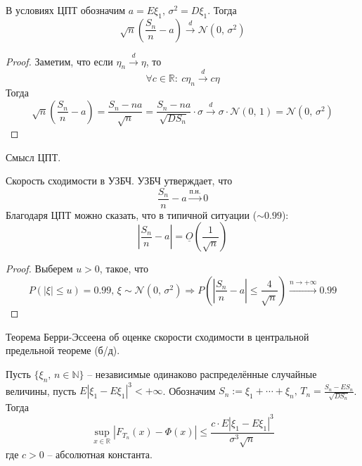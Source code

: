 \begin{corollary}
  В условиях ЦПТ обозначим $a = E\xi_1,\, \sigma^2 = D\xi_1$. Тогда
  \[\sqrt{n}\left(\frac{S_n}{n} - a\right) \stackrel{d}{\to} \mathcal{N}(0,\, \sigma^2)\]
\end{corollary}

\begin{proof}
  Заметим, что если $\eta_n \stackrel{d}{\to} \eta$, то  
  \[\forall c \in \mathbb{R}:\: c\eta_n \stackrel{d}{\to} c\eta\]
  Тогда
  \[\sqrt{n}\left(\frac{S_n}{n} - a\right) = \frac{S_n - na}{\sqrt{n}} = \frac{S_n - na}{\sqrt{DS_n}}\cdot\sigma \stackrel{d}{\to} \sigma\cdot\mathcal{N}(0,\,1) = \mathcal{N}(0,\,\sigma^2)\]
\end{proof}

\begin{note}
Смысл ЦПТ.

Скорость сходимости в УЗБЧ. УЗБЧ утверждает, что
\[\frac{S_n}{n} - a \stackrel{\text{п.н.}}{\to} 0\]
Благодаря ЦПТ можно сказать, что в типичной ситуации ($\sim 0.99$):
\[\left|\frac{S_n}{n} - a\right| = \underline{O}\left(\frac{1}{\sqrt{n}}\right)\]

\end{note}

\begin{proof}
  Выберем $u > 0$, такое, что
  \[P(|\xi| \leq u) = 0.99,\, \xi \sim \mathcal{N}(0,\,\sigma^2) \Rightarrow P\left(\left|\frac{S_n}{n} - a\right| \leq \frac{4}{\sqrt{n}}\right) \stackrel{n \to +\infty}{\to} 0.99\]
\end{proof}

\begin{theorem}
  Теорема Берри-Эссеена об оценке скорости сходимости в центральной предельной теореме (б/д).

  Пусть $\{\xi_n,\, n \in \mathbb{N}\}$ -- независимые одинаково распределённые случайные величины, пусть $E|\xi_1 - E\xi_1|^3 < +\infty$. Обозначим $S_n := \xi_1 + \cdots + \xi_n,\, T_n = \frac{S_n - ES_n}{\sqrt{DS_n}}$. Тогда
  \[\sup_{x \in \mathbb{R}}|F_{T_n}(x) - \Phi(x)| \leq \frac{c \cdot E|\xi_1 - E\xi_1|^3}{\sigma^3\sqrt{n}}\]
  где $c > 0$ -- абсолютная константа.
\end{theorem}
